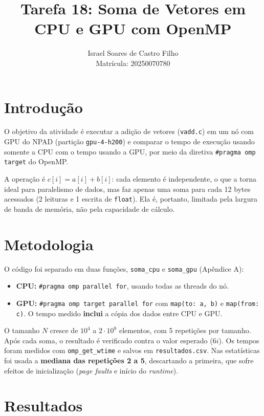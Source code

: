 \documentclass[a4paper,12pt]{article}
\title{Tarefa 18: Soma de Vetores em CPU e GPU com OpenMP}
\author{Israel Soares de Castro Filho \\ Matrícula: 20250070780}
\date{}
\begin{document}
\maketitle

\section{Introdução}

O objetivo da atividade é executar a adição de vetores (\texttt{vadd.c}) em um nó com GPU do NPAD (partição \texttt{gpu-4-h200}) e comparar o tempo de execução usando somente a CPU com o tempo usando a GPU, por meio da diretiva \texttt{\#pragma omp target} do OpenMP.

A operação é $c[i] = a[i] + b[i]$: cada elemento é independente, o que a torna ideal para paralelismo de dados, mas faz apenas uma soma para cada 12 bytes acessados (2 leituras e 1 escrita de \texttt{float}). Ela é, portanto, limitada pela largura de banda de memória, não pela capacidade de cálculo.

\section{Metodologia}

O código foi separado em duas funções, \texttt{soma\_cpu} e \texttt{soma\_gpu} (Apêndice A):

\begin{itemize}
    \item \textbf{CPU:} \texttt{\#pragma omp parallel for}, usando todas as threads do nó.
    \item \textbf{GPU:} \texttt{\#pragma omp target parallel for} com \texttt{map(to: a, b)} e \texttt{map(from: c)}. O tempo medido \textbf{inclui} a cópia dos dados entre CPU e GPU.
\end{itemize}

O tamanho $N$ cresce de $10^4$ a $2\cdot 10^8$ elementos, com 5 repetições por tamanho. Após cada soma, o resultado é verificado contra o valor esperado ($6i$). Os tempos foram medidos com \texttt{omp\_get\_wtime} e salvos em \texttt{resultados.csv}. Nas estatísticas foi usada a \textbf{mediana das repetições 2 a 5}, descartando a primeira, que sofre efeitos de inicialização (\textit{page faults} e início do \textit{runtime}).

\section{Resultados}
\end{document}
